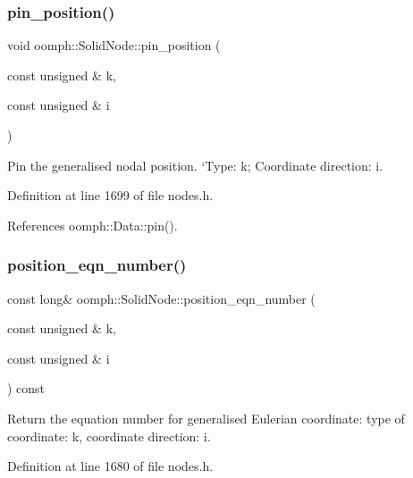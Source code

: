 \subsubsection{\texorpdfstring{pin\+\_\+position()}{pin\_position()}\hspace{0.1cm}{\footnotesize\ttfamily [2/2]}}
{\footnotesize\ttfamily void oomph\+::\+Solid\+Node\+::pin\+\_\+position (\begin{DoxyParamCaption}\item[{const unsigned \&}]{k,  }\item[{const unsigned \&}]{i }\end{DoxyParamCaption})\hspace{0.3cm}{\ttfamily [inline]}}



Pin the generalised nodal position. `\+Type\textquotesingle{}\+: k; Coordinate direction\+: i. 



Definition at line 1699 of file nodes.\+h.



References oomph\+::\+Data\+::pin().

\mbox{\label{classoomph_1_1SolidNode_a8c95f20a479d12604eb083cb01149711}} 
\subsubsection{\texorpdfstring{position\+\_\+eqn\+\_\+number()}{position\_eqn\_number()}}
{\footnotesize\ttfamily const long\& oomph\+::\+Solid\+Node\+::position\+\_\+eqn\+\_\+number (\begin{DoxyParamCaption}\item[{const unsigned \&}]{k,  }\item[{const unsigned \&}]{i }\end{DoxyParamCaption}) const\hspace{0.3cm}{\ttfamily [inline]}}



Return the equation number for generalised Eulerian coordinate\+: type of coordinate\+: k, coordinate direction\+: i. 



Definition at line 1680 of file nodes.\+h.



